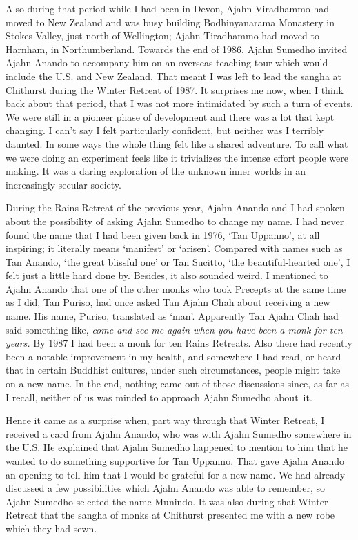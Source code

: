 Also during that period while I had been in Devon, Ajahn Viradhammo had
moved to New Zealand and was busy building Bodhinyanarama Monastery in
Stokes Valley, just north of Wellington; Ajahn Tiradhammo had moved to
Harnham, in Northumberland. Towards the end of 1986, Ajahn Sumedho
invited Ajahn Anando to accompany him on an overseas teaching tour which
would include the U.S. and New Zealand. That meant I was left to lead
the sangha at Chithurst during the Winter Retreat of 1987. It surprises
me now, when I think back about that period, that I was not more
intimidated by such a turn of events. We were still in a pioneer phase
of development and there was a lot that kept changing. I can't say I
felt particularly confident, but neither was I terribly daunted. In some
ways the whole thing felt like a shared adventure. To call what we were
doing an experiment feels like it trivializes the intense effort people
were making. It was a daring exploration of the unknown inner worlds in
an increasingly secular society.

During the Rains Retreat of the previous year, Ajahn Anando and I had
spoken about the possibility of asking Ajahn Sumedho to change my name.
I had never found the name that I had been given back in 1976, `Tan
Uppanno', at all inspiring; it literally means `manifest' or `arisen'.
Compared with names such as Tan Anando, `the great blissful one' or Tan
Sucitto, `the beautiful-hearted one', I felt just a little hard done by.
Besides, it also sounded weird. I mentioned to Ajahn Anando that one of
the other monks who took Precepts at the same time as I did, Tan Puriso,
had once asked Tan Ajahn Chah about receiving a new name. His name,
Puriso, translated as `man'. Apparently Tan Ajahn Chah had said
something like, \emph{come and see me again when you have been a monk
for ten years.} By 1987 I had been a monk for ten Rains Retreats. Also
there had recently been a notable improvement in my health, and
somewhere I had read, or heard that in certain Buddhist cultures, under
such circumstances, people might take on a new name. In the end, nothing
came out of those discussions since, as far as I recall, neither of us
was minded to approach Ajahn Sumedho about~it.

Hence it came as a surprise when, part way through that Winter Retreat,
I received a card from Ajahn Anando, who was with Ajahn Sumedho
somewhere in the U.S. He explained that Ajahn Sumedho happened to
mention to him that he wanted to do something supportive for Tan
Uppanno. That gave Ajahn Anando an opening to tell him that I would be
grateful for a new name. We had already discussed a few possibilities
which Ajahn Anando was able to remember, so Ajahn Sumedho selected the
name Munindo. It was also during that Winter Retreat that the sangha of
monks at Chithurst presented me with a new robe which they had sewn.

